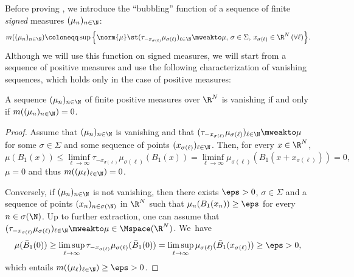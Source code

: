 Before proving , we introduce the \enquote{bubbling} function of a sequence of finite \emph{signed} measures \((\mu_n)_{n\in\N}\):\vspace*{-3pt}
\begin{equation}
m((\mu_n)_{n\in\N})\coloneqq\sup\Big\{ \norm{\mu} \st (\tau_{-x_{\sigma(\ell)}}\mu_{\sigma(\ell)})_{\ell\in\N} \mweakto \mu,\, \sigma \in \Sigma,\, x_{\sigma(\ell)} \in \R^N\, (\forall \ell) \Big\}.
\end{equation}
Although we will use this function on signed measures, we will start from a sequence of positive measures and use the following characterization of vanishing sequences, which holds only in the case of positive measures:
\begin{lemma}\label{concentrationProperties}
A sequence \((\mu_n)_{n\in\N}\) of finite positive measures over $\R^N$ is vanishing if and only if \(m((\mu_n)_{n\in\N})=0\).
\end{lemma}
\begin{proof}
Assume that \((\mu_n)_{n\in\N}\) is vanishing and that \((\tau_{-x_{\sigma(\ell)}}\mu_{\sigma(\ell)})_{\ell\in\N} \mweakto \mu\) for some \(\sigma \in \Sigma\) and some sequence of points \((x_{\sigma(\ell)})_{\ell\in\N}\). Then, for every \(x\in\R^N\),\vspace*{-3pt}
\[
\mu(B_1(x))\le\liminf_{\ell\to\infty}\tau_{-x_{\sigma(\ell)}}\mu_{\sigma(\ell)}(B_1(x))=\liminf_{\ell\to\infty}\mu_{\sigma(\ell)}(B_1(x+x_{\sigma(\ell)}))=0,
\]
\ie \(\mu=0\) and thus \(m((\mu_\ell)_{\ell\in\N})=0\).

Conversely, if \((\mu_n)_{n\in\N}\) is not vanishing, then there exists \(\eps>0\), \(\sigma\in\Sigma\) and a sequence of points \((x_n)_{n\in\sigma(\N)}\) in \(\R^N\) such that \(\mu_n(B_1(x_n))\ge\eps\) for every \(n\in\sigma(\N)\). Up to further extraction, one can assume that \((\tau_{-x_{\sigma(\ell)}}\mu_{\sigma(\ell)})_{\ell\in\N} \mweakto\mu\in\Mspace(\R^N)\). We~have\vspace*{-3pt}
\[
\mu(\bar B_1(0))\ge\limsup_{\ell\to\infty}\tau_{-x_{\sigma(\ell)}}\mu_{\sigma(\ell)}(\bar B_1(0))=\limsup_{\ell\to\infty}\mu_{\sigma(\ell)}(\bar B_1(x_{\sigma(\ell)}))\ge\eps>0,
\]
which entails \(m((\mu_\ell)_{\ell\in\N})\ge\eps>0\).
\end{proof}
